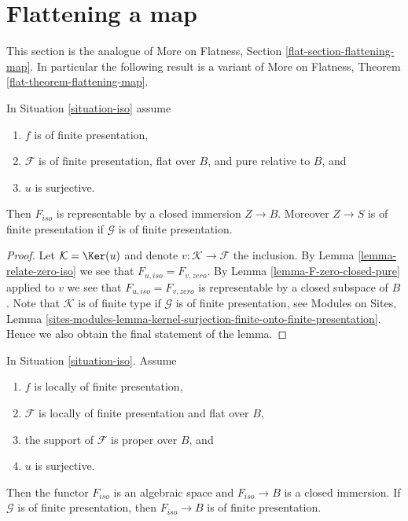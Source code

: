 \section{Flattening a map}
\label{section-flattening-map}

\noindent
This section is the analogue of
More on Flatness, Section \ref{flat-section-flattening-map}.
In particular the following result is a variant of
More on Flatness, Theorem \ref{flat-theorem-flattening-map}.

\begin{theorem}
\label{theorem-flattening-map}
In Situation \ref{situation-iso} assume
\begin{enumerate}
\item $f$ is of finite presentation,
\item $\mathcal{F}$ is of finite presentation, flat over $B$, and
pure relative to $B$, and
\item $u$ is surjective.
\end{enumerate}
Then $F_{iso}$ is representable by a closed immersion $Z \to B$.
Moreover $Z \to S$ is of finite presentation if $\mathcal{G}$ is
of finite presentation.
\end{theorem}

\begin{proof}
Let $\mathcal{K} = \Ker(u)$ and denote $v : \mathcal{K} \to \mathcal{F}$
the inclusion. By Lemma \ref{lemma-relate-zero-iso} we see that
$F_{u, iso} = F_{v, zero}$. By Lemma \ref{lemma-F-zero-closed-pure}
applied to $v$ we see that $F_{u, iso} = F_{v, zero}$ is representable
by a closed subspace of $B$. Note that $\mathcal{K}$ is of finite type
if $\mathcal{G}$ is of finite presentation, see
Modules on Sites, Lemma
\ref{sites-modules-lemma-kernel-surjection-finite-onto-finite-presentation}.
Hence we also obtain the final statement of the lemma.
\end{proof}

\begin{lemma}
\label{lemma-F-iso-closed}
In Situation \ref{situation-iso}. Assume
\begin{enumerate}
\item $f$ is locally of finite presentation,
\item $\mathcal{F}$ is locally of finite presentation and flat over $B$,
\item the support of $\mathcal{F}$ is proper over $B$, and
\item $u$ is surjective.
\end{enumerate}
Then the functor $F_{iso}$ is an algebraic space and $F_{iso} \to B$
is a closed immersion. If $\mathcal{G}$ is of finite presentation, then
$F_{iso} \to B$ is of finite presentation.
\end{lemma}

